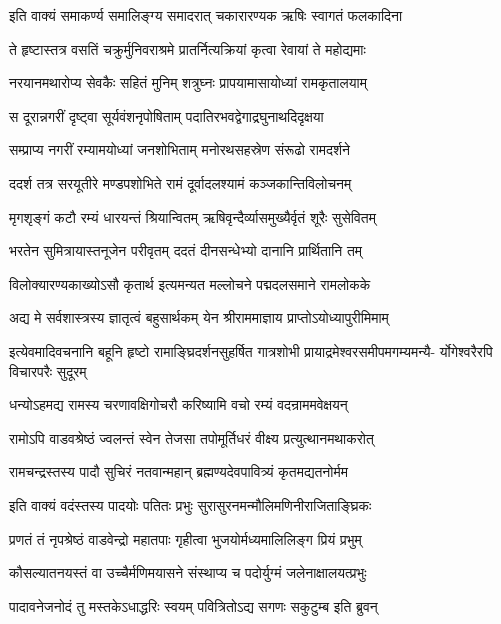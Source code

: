 \twolineshloka
{इति वाक्यं समाकर्ण्य समालिङ्ग्य समादरात्}
{चकारारण्यक ऋषिः स्वागतं फलकादिना}%

\twolineshloka
{ते हृष्टास्तत्र वसतिं चक्रुर्मुनिवराश्रमे}
{प्रातर्नित्यक्रियां कृत्वा रेवायां ते महोद्यमाः}%

\twolineshloka
{नरयानमथारोप्य सेवकैः सहितं मुनिम्}
{शत्रुघ्नः प्रापयामासायोध्यां रामकृतालयाम्}%

\twolineshloka
{स दूरान्नगरीं दृष्ट्वा सूर्यवंशनृपोषिताम्}
{पदातिरभवद्वेगाद्रघुनाथदिदृक्षया}%

\twolineshloka
{सम्प्राप्य नगरीं रम्यामयोध्यां जनशोभिताम्}
{मनोरथसहस्रेण संरूढो रामदर्शने}%

\twolineshloka
{ददर्श तत्र सरयूतीरे मण्डपशोभिते}
{रामं दूर्वादलश्यामं कञ्जकान्तिविलोचनम्}%

\twolineshloka
{मृगशृङ्गं कटौ रम्यं धारयन्तं श्रियान्वितम्}
{ऋषिवृन्दैर्व्यासमुख्यैर्वृतं शूरैः सुसेवितम्}%

\twolineshloka
{भरतेन सुमित्रायास्तनूजेन परीवृतम्}
{ददतं दीनसन्धेभ्यो दानानि प्रार्थितानि तम्}%

\twolineshloka
{विलोक्यारण्यकाख्योऽसौ कृतार्थ इत्यमन्यत}
{मल्लोचने पद्मदलसमाने रामलोकके}%

\twolineshloka
{अद्य मे सर्वशास्त्रस्य ज्ञातृत्वं बहुसार्थकम्}
{येन श्रीराममाज्ञाय प्राप्तोऽयोध्यापुरीमिमाम्}%

\fourlineindentedshloka
{इत्येवमादिवचनानि बहूनि हृष्टो}
{रामाङ्घ्रिदर्शनसुहर्षित गात्रशोभी}
{प्रायाद्रमेश्वरसमीपमगम्यमन्यै-}
{र्योगेश्वरैरपि विचारपरैः सुदूरम्}%

\twolineshloka
{धन्योऽहमद्य रामस्य चरणावक्षिगोचरौ}
{करिष्यामि वचो रम्यं वदन्राममवेक्षयन्}%

\twolineshloka
{रामोऽपि वाडवश्रेष्ठं ज्वलन्तं स्वेन तेजसा}
{तपोमूर्तिधरं वीक्ष्य प्रत्युत्थानमथाकरोत्}%

\twolineshloka
{रामचन्द्रस्तस्य पादौ सुचिरं नतवान्महान्}
{ब्रह्मण्यदेवपावित्र्यं कृतमद्यतनोर्मम}%

\twolineshloka
{इति वाक्यं वदंस्तस्य पादयोः पतितः प्रभुः}
{सुरासुरनमन्मौलिमणिनीराजिताङ्घ्रिकः}%

\twolineshloka
{प्रणतं तं नृपश्रेष्ठं वाडवेन्द्रो महातपाः}
{गृहीत्वा भुजयोर्मध्यमालिलिङ्ग प्रियं प्रभुम्}%

\twolineshloka
{कौसल्यातनयस्तं वा उच्चैर्मणिमयासने}
{संस्थाप्य च पदोर्युग्मं जलेनाक्षालयत्प्रभुः}%

\twolineshloka
{पादावनेजनोदं तु मस्तकेऽधाद्धरिः स्वयम्}
{पवित्रितोऽद्य सगणः सकुटुम्ब इति ब्रुवन्}%


